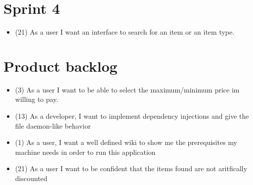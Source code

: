 \documentclass[11pt]{article}
\begin{document}
	\section*{Sprint 4}
	    \vspace{-3mm}
	    \begin{itemize}
		    \item (21) As a user I want an interface to search for an item or an item type. 
		\end{itemize}	
	\section*{Product backlog}
	    \vspace{-3mm}
	    \begin{itemize}
		    \item (3) As a user I want to be able to select the maximum/minimum price im willing to pay.
		    \item (13) As a developer, I want to implement dependency injections and give the file daemon-like behavior
		    \item (1) As a user, I want a well defined wiki to show me the prerequisites my machine needs in order to run this application
		    \item (21) As a user I want to be confident that the items found are not aritfically discounted
		\end{itemize}
\end{document}
